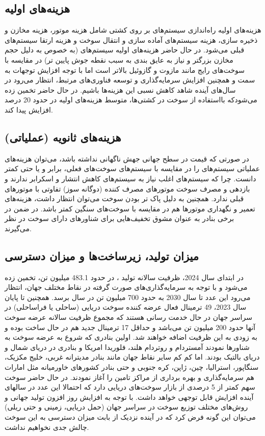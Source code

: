 \subsection{هزینه‌های اولیه}
هزینه‌های اولیه راه‌اندازی سیستم‌های  بر روی کشتی شامل هزینه موتور، هزینه مخازن و ذخیره سازی، هزینه سیستم‌های آماده سازی و انتقال سوخت و هزینه ارتقا سیستم‌های قبلی می‌شود. در حال حاضر هزینه‌های اولیه سیستم‌های  (به خصوص به دلیل حجم مخازن بزرگتر و نیاز به عایق بندی به سبب نقطه جوش پایین تر) در مقایسه با سوخت‌های رایج مانند مازوت و گازوئیل بالاتر است اما با توجه افزایش توجهات به سمت  و همچنین افزایش سرمایه‌گذاری و توسعه فناوری‌های مرتبط، انتظار می‌رود در سال‌های آینده شاهد کاهش نسبی این هزینه‌ها باشیم. در حال حاضر تخمین زده می‌شودکه بااستفاده از سوخت  در کشتی‌ها، متوسط هزینه‌های اولیه در حدود 20 درصد افزایش پیدا کند. 
\subsection{هزینه‌های ثانویه (عملیاتی)}
در صورتی که قیمت  در سطح جهانی جهش ناگهانی نداشته باشد، می‌توان هزینه‌های عملیاتی سیستم‌های  را در مقایسه با سیستم‌های سوخت‌های فعلی، برابر و یا حتی کمتر دانست. چرا که سیستم‌های  اغلب نیاز به سیستم‌های کاهش انتشار و اسکرابر ندارند و بازدهی و مصرف سوخت موتورهای مصرف کننده  (دوگانه سوز) تفاوتی با موتورهای قبلی ندارد. همچنین به دلیل پاک تر بودن سوخت  می‌توان انتظار داشت، هزینه‌های تعمیر و نگهداری موتورها هم در مقایسه با سوخت‌های سنگین کمتر باشد. در ضمن در برخی بنادر به عنوان مشوق تخفیف‌هایی برای شناورهای دارای سوخت  در نظر می‌گیرند. 
\subsection{میزان تولید، زیرساخت‌ها و میزان دسترسی}
در ابتدای سال 2024، ظرفیت سالانه تولید ، در حدود 483.1 میلیون تن، تخمین زده می‌شود و با توجه به سرمایه‌گذاری‌های صورت گرفته در نقاط مختلف جهان، انتظار می‌رود این عدد تا سال 2030 به حدود 700 میلیون تن در سال برسد.
همچنین تا پایان سال 2023، 49 ترمینال فعال عرضه کننده سوخت  دریایی (ساحلی یا فراساحلی) در سراسر جهان در حال خدمت رسانی هستند که مجموع ظرفیت سالانه عرضه سوخت آنها حدود 200 میلیون تن می‌باشد و حداقل 17 ترمینال جدید هم در حال ساخت بوده و به زودی به این ظرفیت اضافه خواهند شد.
اولین بنادری که شروع به عرضه سوخت  به شناورها نمودند آمستردام و روتردام هلند، فلوریدا امریکا و بنادری در دریای شمال و دریای بالتیک بودند. اما کم کم سایر نقاط جهان مانند بنادر مدیترانه غربی، خلیج مکزیک، سنگاپور، استرالیا، چین، ژاپن، کره جنوبی و حتی بنادر کشورهای خاورمیانه مثل امارات هم سرمایه‌گذاری و بهره برداری از مراکز تامین  را آغاز نمودند. 
در حال حاضر سوخت  سهم کمتر از 5 درصدی از بازار سوخت‌های دریایی دارد که احتمالا این عدد در سالهای آینده افزایش قابل توجهی خواهد داشت. با توجه به افزایش روز افزون تولید جهانی  و روش‌های مختلف توزیع  سوخت در سراسر جهان (حمل دریایی، زمینی و حتی ریلی) می‌توان این گونه فرض کرد که در آینده نزدیک از بابت میزان دسترسی به این سوخت چالش جدی نخواهیم نداشت.
